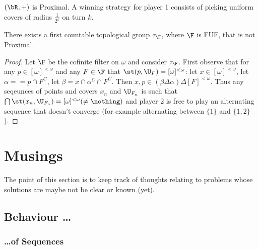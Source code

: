 \documentclass{article}
\begin{document}
\begin{exam}
    \((\bR, +)\) is Proximal. A winning strategy for player 1 consists of picking uniform covers of radius \(\frac{1}{2^k}\) on turn \(k\).
\end{exam}

\begin{prop}
    There exists a first countable topological group \(\tau_{\F}\), where \(\F\) is FUF, that is not Proximal. 
\end{prop}
\begin{proof}
    Let \(\F\) be the cofinite filter on \(\omega\) and consider \(\tau_{\F}\). First observe that for any \(p \in [\omega]^{< \omega}\) and any \(F \in \F\) that \(\st(p, \U_F) = [\omega]^{< \omega}\): let \(x \in [\omega]^{< \omega}\), let \(\alpha = = p \cap F^C\), let \(\beta = x \cap \alpha^C \cap F^C\). Then \(x, p \in (\beta\Delta\alpha)\Delta [F]^{< \omega}\). Thus any seqeunces of points and covers \(x_n\) and \(\U_{F_n}\) is such that \(\bigcap \st(x_n, \U_{F_n}) = [\omega]^{<\omega} (\neq \nothing)\) and player 2 is free to play an alternating sequence that doesn't converge (for example alternating between \(\{1\}\) and \(\{1, 2\}\)).
\end{proof}
\section{Musings}
The point of this section is to keep track of thoughts relating to problems whose solutions are maybe not be clear or known (yet). 



\subsection{Behaviour \dots}

\subsubsection*{\dots of Sequences}
\end{document}
